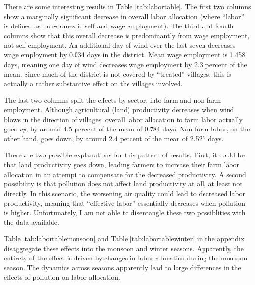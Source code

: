 \documentclass[
]{article}
\begin{document}
There are some interesting results in Table \ref{tab:labortable}. The first two columns show a marginally significant decrease in overall labor allocation (where ``labor'' is defined as non-domestic self and wage employment). The third and fourth columns show that this overall decrease is predominantly from wage employment, not self employment. An additional day of wind over the last seven decreases wage employment by 0.034 days in the district. Mean wage employment is 1.458 days, meaning one day of wind decreases wage employment by 2.3 percent of the mean. Since much of the district is not covered by ``treated'' villages, this is actually a rather substantive effect on the villages involved.

The last two columns split the effects by sector, into farm and non-farm employment. Although agricultural (land) productivity decreases when wind blows in the direction of villages, overall labor allocation to farm labor actually goes \emph{up}, by around 4.5 percent of the mean of 0.784 days. Non-farm labor, on the other hand, goes down, by around 2.4 percent of the mean of 2.527 days.

There are two possible explanations for this pattern of results. First, it could be that land productivity goes down, leading farmers to increase their farm labor allocation in an attempt to compensate for the decreased productivity. A second possibility is that pollution does not affect land productivity at all, at least not directly. In this scenario, the worsening air quality could lead to decreased labor productivity, meaning that ``effective labor'' essentially decreases when pollution is higher. Unfortunately, I am not able to disentangle these two possiblities with the data available.

Table \ref{tab:labortablemonsoon} and Table \ref{tab:labortablewinter} in the appendix disaggregate these effects into the monsoon and winter seasons. Apparently, the entirety of the effect is driven by changes in labor allocation during the monsoon season. The dynamics across seasons apparently lead to large differences in the effects of pollution on labor allocation.
\end{document}
